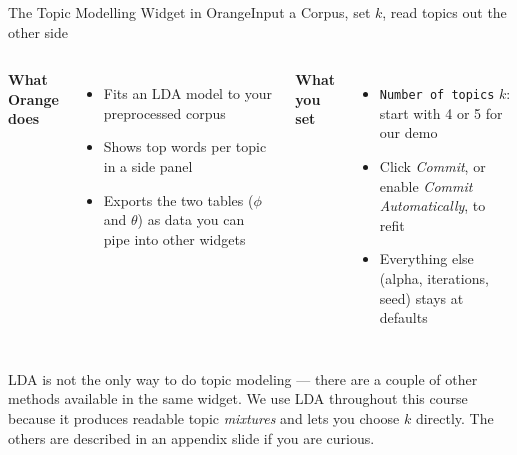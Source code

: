 \documentclass[aspectratio=169,10pt]{beamer}
\begin{document}
\begin{frame}{The Topic Modelling Widget in Orange}{Input a Corpus, set $k$, read topics out the other side}
  \begin{columns}[T, onlytextwidth]
      \textbf{What Orange does}
      \begin{itemize}
        \item Fits an LDA model to your preprocessed corpus
        \item Shows top words per topic in a side panel
        \item Exports the two tables ($\phi$ and $\theta$) as data you can pipe into other widgets
      \end{itemize}
      \textbf{What you set}
      \begin{itemize}
        \item \texttt{Number of topics} $k$: start with 4 or 5 for our demo
        \item Click \emph{Commit}, or enable \emph{Commit Automatically}, to refit
        \item Everything else (alpha, iterations, seed) stays at defaults
      \end{itemize}
  \end{columns}

  \vspace{0.6em}
  \begin{callblue}
    LDA is not the only way to do topic modeling --- there are a couple of other methods available in the same widget. We use LDA throughout this course because it produces readable topic \emph{mixtures} and lets you choose $k$ directly. The others are described in an appendix slide if you are curious.
  \end{callblue}
\end{frame}
\end{document}
